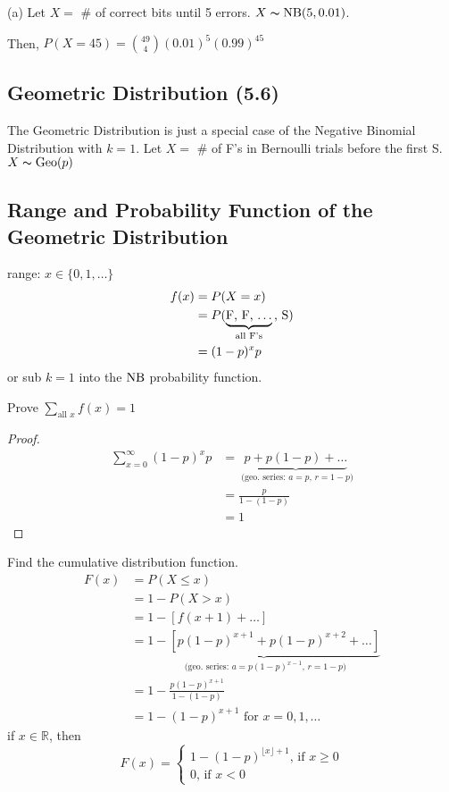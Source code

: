 (a) Let $ X= $ \# of correct bits until 5 errors.
$ X\thicksim\operatorname{NB}(5,0.01) $. 

Then, $ P(X=45)=\binom{49}{4}(0.01)^5(0.99)^{45} $ 

\subsection{Geometric Distribution (5.6)}
The Geometric Distribution is just a special case of the
Negative Binomial Distribution with $ k=1 $.
Let $ X= $ \# of F's in Bernoulli trials before the first S.
$ X\thicksim\operatorname{Geo}(p) $

\subsection{Range and Probability Function of the Geometric Distribution}
range: $ x\in\{0,1,\ldots \} $ 
\begin{align*}
    f(x)&=P(X=x)\\
    &=P( \underbrace{\text{F, F, $ \ldots $}}_{\text{all F's}}
    \text{, S})\\
    &=(1-p)^x p
\end{align*}
or sub $ k=1 $ into the $ \operatorname{NB} $ probability function.

Prove $ \sum\limits_{\text{all } x}^{} f(x) =1$
\begin{proof}
    \begin{align*}
        \sum\limits_{x=0}^{\infty} (1-p)^x p
        &=\underbrace{p+p(1-p)+\dots}_
        \text{ (geo. series: $a=p$, $r=1-p$)}\\
        &=\frac{p}{1-(1-p)}\\
        &=1
    \end{align*}
\end{proof}

Find the cumulative distribution function.
\begin{align*}
    F(x)&=P(X\le x)\\
    &=1-P(X>x)\\
    &=1-[f(x+1)+\dots]\\
    &=\underbrace{1-[p(1-p)^{x+1}+p(1-p)^{x+2}+\dots]}_
    \text{ (geo. series: $a=p(1-p)^{x-1}$, $r=1-p$)}\\
    &=1-\frac{p(1-p)^{x+1}}{1-(1-p)}\\
    &=1-(1-p)^{x+1} \text{ for } x=0,1,\ldots
\end{align*}
if $ x\in\mathbb{R} $, then
\[ F(x)=
\begin{cases}
    1-(1-p)^{\lfloor x \rfloor +1} \text{, if } x\ge 0\\
    0 \text{, if } x < 0
\end{cases} \]


